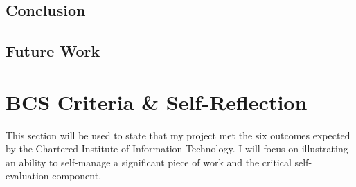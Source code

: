 \documentclass[12pt]{article}
\begin{document}
\subsection{Conclusion}

\subsection{Future Work}

\section{BCS Criteria \& Self-Reflection}
This section will be used to state that my project met the six outcomes expected by the Chartered Institute of Information Technology\cite{BCS2020}.
I will focus on illustrating an ability to self-manage a significant piece of work and the critical self-evaluation component.
\end{document}

